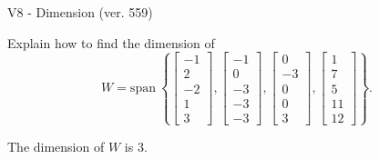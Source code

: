 \begin{exercise}
  \begin{exerciseTitle}V8 - Dimension (ver. 559)\end{exerciseTitle}
  \begin{exerciseStatement}
    Explain how to find the dimension of 
\[W=\mathrm{span}\ \left\{\left[\begin{array}{r}
-1 \\
2 \\
-2 \\
1 \\
3
\end{array}\right] , \left[\begin{array}{r}
-1 \\
0 \\
-3 \\
-3 \\
-3
\end{array}\right] , \left[\begin{array}{r}
0 \\
-3 \\
0 \\
0 \\
3
\end{array}\right] , \left[\begin{array}{r}
1 \\
7 \\
5 \\
11 \\
12
\end{array}\right]\right\}.\]



  \end{exerciseStatement}
  \begin{exerciseAnswer}
   The dimension of \(W\) is  \(3\).
  


  \end{exerciseAnswer}
\end{exercise}